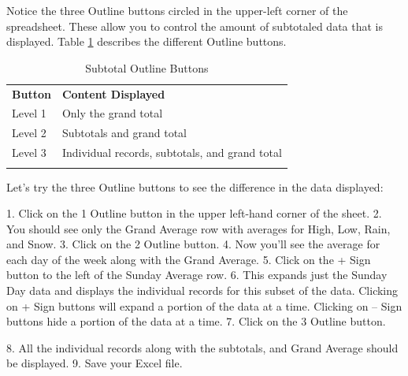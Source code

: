 Notice the three Outline buttons circled in the upper-left corner of the spreadsheet. These allow you
to control the amount of subtotaled data that is displayed. Table \ref{05:tab06} describes the different Outline buttons.

{\small
	\begin{longtable}{p{0.50in}p{3.00in}} %
		\textbf{Button} & \textbf{Content Displayed} \endhead
		\hline \\
		Level 1 & Only the grand total\\
		Level 2 & Subtotals and grand total\\
		Level 3 & Individual records, subtotals, and grand total\\
		\caption{Subtotal Outline Buttons}
		\label{05:tab06}
	\end{longtable}
}


Let’s try the three Outline buttons to see the difference in the data displayed:

1. Click on the 1 Outline button in the upper left-hand corner of the sheet.
2. You should see only the Grand Average row with averages for High, Low, Rain, and Snow.
3. Click on the 2 Outline button.
4. Now you’ll see the average for each day of the week along with the Grand Average.
5. Click on the + Sign button to the left of the Sunday Average row.
6. This expands just the Sunday Day data and displays the individual records for this subset of the
data. Clicking on + Sign buttons will expand a portion of the data at a time. Clicking on – Sign
buttons hide a portion of the data at a time.
7. Click on the 3 Outline button.

8. All the individual records along with the subtotals, and Grand Average should be displayed.
9. Save your Excel file.

